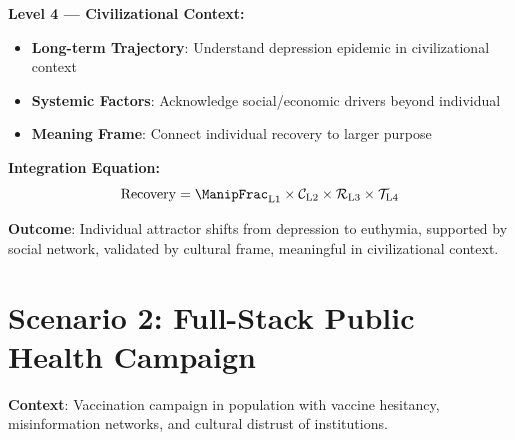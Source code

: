 \documentclass[11pt,twoside]{book}
\newcommand{\Trajectory}{\mathcal{T}}
\newcommand{\Cascade}{\mathcal{C}}
\begin{document}
\begin{tcolorbox}[colback=green!5!white,colframe=green!65!black,title=\textbf{Therapeutic Stack Deployment},breakable]
\textbf{Level 4 --- Civilizational Context:}
\begin{itemize}
    \item \textbf{Long-term Trajectory}: Understand depression epidemic in civilizational context
    \item \textbf{Systemic Factors}: Acknowledge social/economic drivers beyond individual
    \item \textbf{Meaning Frame}: Connect individual recovery to larger purpose
\end{itemize}

\textbf{Integration Equation:}
\begin{equation}
    \mathrm{Recovery} = \ManipFrac_{\mathrm{L1}} \times \Cascade_{\mathrm{L2}} \times
    \mathcal{R}_{\mathrm{L3}} \times \Trajectory_{\mathrm{L4}}
\end{equation}

\textbf{Outcome}: Individual attractor shifts from depression to euthymia, supported by
social network, validated by cultural frame, meaningful in civilizational context.

\end{tcolorbox}

\section{Scenario 2: Full-Stack Public Health Campaign}

\textbf{Context}: Vaccination campaign in population with vaccine hesitancy,
misinformation networks, and cultural distrust of institutions.
\end{document}
